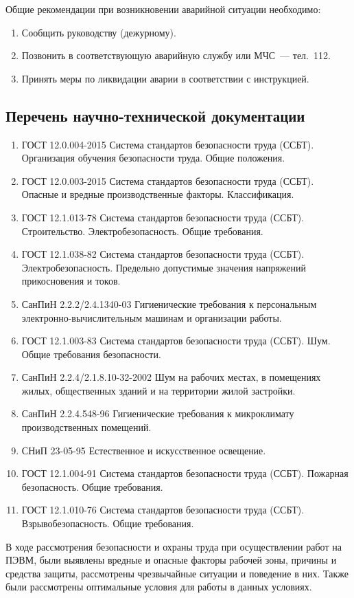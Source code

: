 Общие рекомендации при возникновении аварийной ситуации необходимо:
\begin{enumerate}
    \item Сообщить руководству (дежурному).
    \item Позвонить в соответствующую аварийную службу или МЧС~--- тел.~112.
    \item Принять меры по ликвидации аварии в соответствии с инструкцией.
\end{enumerate}


\subsection{Перечень научно-технической документации}

\begin{enumerate}[leftmargin=\labelwidth+\labelsep]
    \item ГОСТ 12.0.004-2015 Система стандартов безопасности труда (ССБТ). Организация обучения безопасности труда. Общие положения.
    \item ГОСТ 12.0.003-2015 Система стандартов безопасности труда (ССБТ). Опасные и вредные производственные факторы. Классификация.
    \item ГОСТ 12.1.013-78 Система стандартов безопасности труда (ССБТ). Строительство. Электробезопасность. Общие требования.
    \item ГОСТ 12.1.038-82 Система стандартов безопасности труда (ССБТ). Электробезопасность. Предельно допустимые значения напряжений прикосновения и токов.
    \item СанПиН 2.2.2/2.4.1340-03 Гигиенические требования к персональным электронно-вычислительным машинам и организации работы.
    \item ГОСТ 12.1.003-83 Система стандартов безопасности труда (ССБТ). Шум. Общие требования безопасности.
    \item СанПиН 2.2.4/2.1.8.10-32-2002 Шум на рабочих местах, в помещениях жилых, общественных зданий и на территории жилой застройки.
    \item СанПиН 2.2.4.548-96 Гигиенические требования к микроклимату производственных помещений.
    \item СНиП 23-05-95 Естественное и искусственное освещение.
    \item ГОСТ 12.1.004-91 Система стандартов безопасности труда (ССБТ). Пожарная безопасность. Общие требования.
    \item ГОСТ 12.1.010-76 Система стандартов безопасности труда (ССБТ). Взрывобезопасность. Общие требования.
\end{enumerate}



В ходе рассмотрения безопасности и охраны труда при осуществлении работ на ПЭВМ, были выявлены вредные и опасные факторы рабочей зоны, причины и средства защиты, рассмотрены чрезвычайные ситуации и поведение в них. 
Также были рассмотрены оптимальные условия для работы в данных условиях.